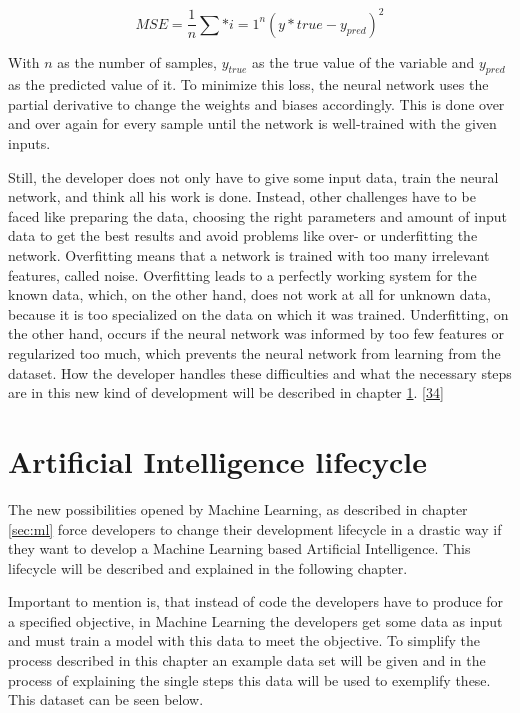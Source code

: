 \documentclass[12pt,english,a4paper,oneside,,tablecaptionabove]{scrbook}
\begin{document}
\begin{equation}

MSE = \frac{1}{n}\sum*{i=1}^{n}{(y*{true}-y_{pred})^2}

\end{equation}

With \(n\) as the number of samples, \(y_{true}\) as the true value of
the variable and \(y_{pred}\) as the predicted value of it. To minimize
this loss, the neural network uses the partial derivative to change the
weights and biases accordingly. This is done over and over again for
every sample until the network is well-trained with the given inputs.

Still, the developer does not only have to give some input data, train
the neural network, and think all his work is done. Instead, other
challenges have to be faced like preparing the data, choosing the right
parameters and amount of input data to get the best results and avoid
problems like over- or underfitting the network. Overfitting means that
a network is trained with too many irrelevant features, called noise.
Overfitting leads to a perfectly working system for the known data,
which, on the other hand, does not work at all for unknown data, because
it is too specialized on the data on which it was trained. Underfitting,
on the other hand, occurs if the neural network was informed by too few
features or regularized too much, which prevents the neural network from
learning from the dataset. How the developer handles these difficulties
and what the necessary steps are in this new kind of development will be
described in chapter \ref{sec:aicycle}.
{[}\protect\hyperlink{ref-Goodfellow-et-al-2016}{34}{]}

\hypertarget{sec:aicycle}{%
\section{Artificial Intelligence lifecycle}\label{sec:aicycle}}

The new possibilities opened by Machine Learning, as described in
chapter \ref{sec:ml} force developers to change their development
lifecycle in a drastic way if they want to develop a Machine Learning
based Artificial Intelligence. This lifecycle will be described and
explained in the following chapter.

Important to mention is, that instead of code the developers have to
produce for a specified objective, in Machine Learning the developers
get some data as input and must train a model with this data to meet the
objective. To simplify the process described in this chapter an example
data set will be given and in the process of explaining the single steps
this data will be used to exemplify these. This dataset can be seen
below.
\end{document}
